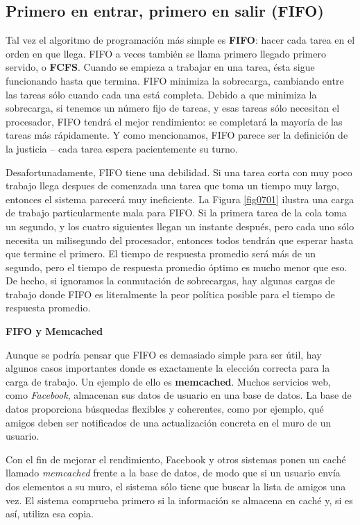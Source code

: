 \documentclass[10pt]{book}
\begin{document}
\subsection{Primero en entrar, primero en salir (FIFO)}
Tal vez el algoritmo de programación más simple es \textbf{FIFO}: hacer cada tarea en el orden en que llega. FIFO a veces también se llama primero llegado primero servido, o \textbf{FCFS}. Cuando se empieza a trabajar en una tarea, ésta sigue funcionando hasta que termina. FIFO minimiza la sobrecarga, cambiando entre las tareas sólo cuando cada una está completa. Debido a que minimiza la sobrecarga, si tenemos un número fijo de tareas, y esas tareas sólo necesitan el procesador, FIFO tendrá el mejor rendimiento: se completará la mayoría de las tareas más rápidamente. Y como mencionamos, FIFO parece ser la definición de la justicia -- cada tarea espera pacientemente su turno.

Desafortunadamente, FIFO tiene una debilidad. Si una tarea corta con muy poco trabajo llega despues de comenzada una tarea que toma un tiempo muy largo, entonces el sistema parecerá muy ineficiente. La Figura \ref{fig0701} ilustra una carga de trabajo particularmente mala para FIFO. Si la primera tarea de la cola toma un segundo, y los cuatro siguientes llegan un instante después, pero cada uno sólo necesita un milisegundo del procesador, entonces todos tendrán que esperar hasta que termine el primero. El tiempo de respuesta promedio será más de un segundo, pero el tiempo de respuesta promedio óptimo es mucho menor que eso. De hecho, si ignoramos la conmutación de sobrecargas, hay algunas cargas de trabajo donde FIFO es literalmente la peor política posible para el tiempo de respuesta promedio.

\textbf{FIFO y Memcached}

Aunque se podría pensar que FIFO es demasiado simple para ser útil, hay algunos casos importantes donde es exactamente la elección correcta para la carga de trabajo. Un ejemplo de ello es \textbf{memcached}. Muchos servicios web, como \textit{Facebook}, almacenan sus datos de usuario en una base de datos. La base de datos proporciona búsquedas flexibles y coherentes, como por ejemplo, qué amigos deben ser notificados de una actualización concreta en el muro de un usuario.

Con el fin de mejorar el rendimiento, Facebook y otros sistemas ponen un caché llamado \textit{memcached} frente a la base de datos, de modo que si un usuario envía dos elementos a su muro, el sistema sólo tiene que buscar la lista de amigos una vez. El sistema comprueba primero si la información se almacena en caché y, si es así, utiliza esa copia.
\end{document}
